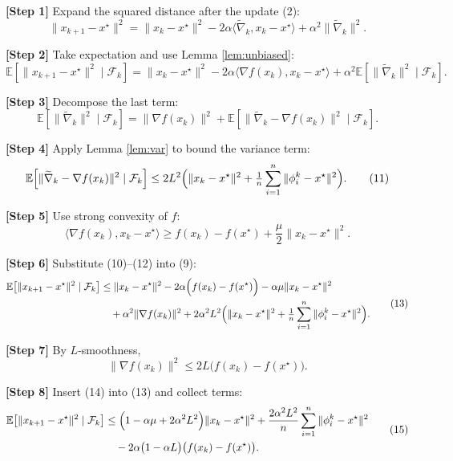 \documentclass{article}
\newcommand{\E}{\mathbb{E}}
\begin{document}
\noindent\textbf{[Step 1]} Expand the squared distance after the update (2):
\[
\|x_{k+1}-x^\star\|^{2}
= \|x_k-x^\star\|^{2}
-2\alpha\langle\widetilde{\nabla}_k,x_k-x^\star\rangle
+\alpha^{2}\|\widetilde{\nabla}_k\|^{2}.
\tag{8}
\]

\noindent\textbf{[Step 2]} Take expectation and use Lemma \ref{lem:unbiased}:
\[
\E\!\left[\|x_{k+1}-x^\star\|^{2}\mid\mathcal{F}_k\right]
= \|x_k-x^\star\|^{2}
-2\alpha\langle\nabla f(x_k),x_k-x^\star\rangle
+\alpha^{2}\E\!\left[\|\widetilde{\nabla}_k\|^{2}\mid\mathcal{F}_k\right].
\tag{9}
\]

\noindent\textbf{[Step 3]} Decompose the last term:
\[
\E\!\left[\|\widetilde{\nabla}_k\|^{2}\mid\mathcal{F}_k\right]
= \|\nabla f(x_k)\|^{2}
+ \E\!\left[\|\widetilde{\nabla}_k-\nabla f(x_k)\|^{2}\mid\mathcal{F}_k\right].
\tag{10}
\]

\noindent\textbf{[Step 4]} Apply Lemma \ref{lem:var} to bound the variance term:
\[
\E\!\left[\|\widetilde{\nabla}_k-\nabla f(x_k)\|^{2}\mid\mathcal{F}_k\right]
\le 2L^{2}\Bigl(\|x_k-x^\star\|^{2}+\tfrac1n\sum_{i=1}^{n}\|\phi_i^{k}-x^\star\|^{2}\Bigr).
\tag{11}
\]

\noindent\textbf{[Step 5]} Use strong convexity of $f$:
\[
\langle\nabla f(x_k),x_k-x^\star\rangle\ge
f(x_k)-f(x^\star)+\frac{\mu}{2}\|x_k-x^\star\|^{2}.
\tag{12}
\]

\noindent\textbf{[Step 6]} Substitute (10)–(12) into (9):
\[
\begin{aligned}
\E\!\left[\|x_{k+1}-x^\star\|^{2}\mid\mathcal{F}_k\right]
&\le \|x_k-x^\star\|^{2}
-2\alpha\Bigl(f(x_k)-f(x^\star)\Bigr)
-\alpha\mu\|x_k-x^\star\|^{2}\\
&\quad +\alpha^{2}\|\nabla f(x_k)\|^{2}
+2\alpha^{2}L^{2}\Bigl(\|x_k-x^\star\|^{2}+\tfrac1n\sum_{i=1}^{n}\|\phi_i^{k}-x^\star\|^{2}\Bigr).
\end{aligned}
\tag{13}
\]

\noindent\textbf{[Step 7]} By $L$‑smoothness,
\[
\|\nabla f(x_k)\|^{2}\le 2L\bigl(f(x_k)-f(x^\star)\bigr).
\tag{14}
\]

\noindent\textbf{[Step 8]} Insert (14) into (13) and collect terms:
\[
\begin{aligned}
\E\!\left[\|x_{k+1}-x^\star\|^{2}\mid\mathcal{F}_k\right]
&\le\Bigl(1-\alpha\mu+2\alpha^{2}L^{2}\Bigr)\|x_k-x^\star\|^{2}
+\frac{2\alpha^{2}L^{2}}{n}\sum_{i=1}^{n}\|\phi_i^{k}-x^\star\|^{2}\\
&\quad -2\alpha\bigl(1-\alpha L\bigr)\bigl(f(x_k)-f(x^\star)\bigr).
\end{aligned}
\tag{15}
\]
\end{document}
